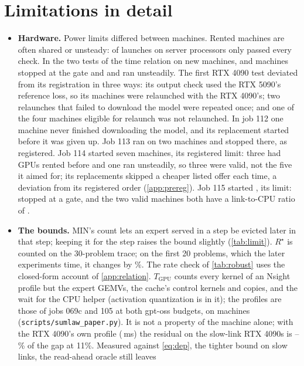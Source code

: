 \section{Limitations in detail}\label{app:limits}
\begin{itemize}\setlength\itemsep{1pt}
\item \textbf{Hardware.} Power limits differed between machines. Rented machines are often shared or unsteady: of
\jmServAll{} launches on server processors only \jmServWord{} passed every check. In the two tests of the time relation on new
machines, \jlGated{} and \jmGated{} machines stopped at the gate and \jlInvalid{} and \jmInvalid{} ran unsteadily.
The first RTX 4090 test deviated from its registration in three ways: its output check used the RTX 5090's reference
loss, so its machines were relaunched with the RTX 4090's; two relaunches that failed to download the model were
repeated once; and one of the four machines eligible for relaunch was not relaunched. In job 112 one
machine never finished downloading the model, and its replacement started before it was given up. Job 113 ran on two
machines and stopped there, as registered. Job 114 started seven machines, its registered limit: three had GPUs rented
before and one ran unsteadily, so three were valid, not the five it aimed for; its replacements skipped a cheaper listed
offer each time, a deviation from its registered order (\cref{app:prereg}). Job 115 started \dqStartedWord, its limit: \dqGated{}
stopped at a gate, and the two valid machines both have a link-to-CPU ratio of \dqRatioRng.
\item \textbf{The bounds.} MIN's count lets an expert served in a step be evicted later in that step; keeping it for
the step raises the bound slightly (\cref{tab:limit}). $R^\star$ is counted on the 30-problem trace; on the first 20
problems, which the later experiments time, it changes by \rsDiffLow\%. The rate check of \cref{tab:robust} uses the
closed-form account of \cref{app:relation}. $T_{\text{GPU}}$ counts every kernel of an Nsight profile but the
expert GEMVs, the cache's control kernels and copies, and the wait for the CPU helper (activation quantization is in
it); the \slProfN{} profiles are those of jobs 069c and 105 at both gpt-oss budgets, on \slProfHosts{} machines
(\texttt{scripts/sumlaw\_paper.py}). It is not a property of the machine alone; with the RTX
4090's own profile (\cxTgpuLow\,ms) the residual on the slow-link RTX 4090s is \cxResidOwnLowMin--\cxResidOwnLowMax\%
of the gap at 11\%. Measured against \cref{eq:dep}, the tighter bound on slow links, the read-ahead oracle still leaves

\end{itemize}
